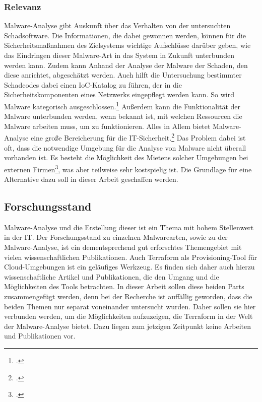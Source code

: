\subsubsection{Relevanz}
Malware-Analyse gibt Auskunft über das Verhalten von der untersuchten Schadsoftware. Die Informationen, die dabei gewonnen werden, können für die Sicherheitsmaßnahmen des Zielsystems wichtige Aufschlüsse darüber geben, wie das Eindringen dieser Malware-Art in das System in Zukunft unterbunden werden kann. Zudem kann Anhand der Analyse der Malware der Schaden, den diese anrichtet, abgeschätzt werden. Auch hilft die Untersuchung bestimmter Schadcodes dabei einen IoC-Katalog zu führen, der in die Sicherheitskomponenten eines Netzwerks eingepflegt werden kann. So wird Malware kategorisch ausgeschlossen.\footcite[S.1]{WhyAnaly} 
\newline Außerdem kann die Funktionalität der Malware unterbunden werden, wenn bekannt ist, mit welchen Ressourcen die Malware arbeiten muss, um zu funktionieren. Alles in Allem bietet Malware-Analyse eine große Bereicherung für die IT-Sicherheit.\footcite{BookPrcMal} Das Problem dabei ist oft, dass die notwendige Umgebung für die Analyse von Malware nicht überall vorhanden ist. Es besteht die Möglichkeit des Mietens solcher Umgebungen bei externen Firmen\footcite{MietUmg}, was aber teilweise sehr kostspielig ist. Die Grundlage für eine Alternative dazu soll in dieser Arbeit geschaffen werden.
\subsection{Forschungsstand}
Malware-Analyse und die Erstellung dieser ist ein Thema mit hohem Stellenwert in der IT. Der Forschungsstand zu einzelnen Malwarearten, sowie zu der Malware-Analyse, ist ein dementsprechend gut erforschtes Themengebiet mit vielen wissenschaftlichen Publikationen. Auch \dq Terraform \dq{} als Provisioning-Tool für Cloud-Umgebungen ist ein geläufiges Werkzeug. Es finden sich daher auch hierzu wissenschaftliche Artikel und Publikationen, die den Umgang und die Möglichkeiten des Tools betrachten. 
\newline
In dieser Arbeit sollen diese beiden Parts zusammengefügt werden, denn bei der Recherche ist auffällig geworden, dass die beiden Themen nur separat voneinander untersucht wurden. Daher sollen sie hier verbunden werden, um die Möglichkeiten aufzuzeigen, die Terraform in der Welt der Malware-Analyse bietet. Dazu liegen zum jetzigen Zeitpunkt keine Arbeiten und Publikationen vor.
